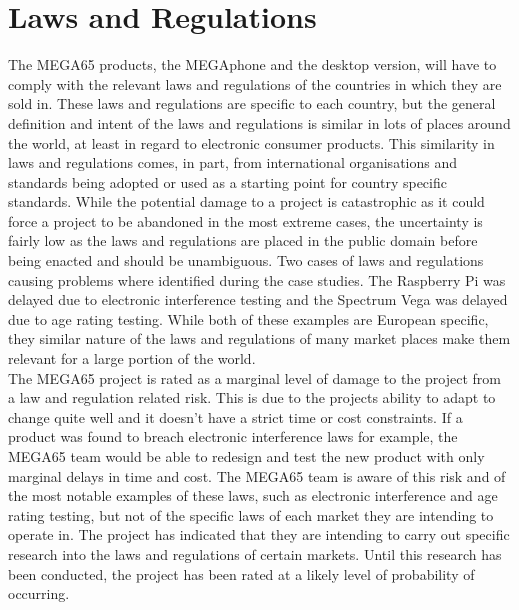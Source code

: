\section{Laws and Regulations}
The MEGA65 products, the MEGAphone and the desktop version, will have to comply with the relevant laws and regulations of the countries in which they are sold in. These laws and regulations are specific to each country, but the general definition and intent of the laws and regulations is similar in lots of places around the world, at least in regard to electronic consumer products. This similarity in laws and regulations comes, in part, from international organisations and standards being adopted or used as a starting point for country specific standards. While the potential damage to a project is catastrophic as it could force a project to be abandoned in the most extreme cases, the uncertainty is fairly low as the laws and regulations are placed in the public domain before being enacted and should be unambiguous. Two cases of laws and regulations causing problems where identified during the case studies. The Raspberry Pi was delayed due to electronic interference testing and the Spectrum Vega was delayed due to age rating testing. While both of these examples are European specific, they similar nature of the laws and regulations of many market places make them relevant for a large portion of the world. \\

The MEGA65 project is rated as a marginal level of damage to the project from a law and regulation related risk. This is due to the projects ability to adapt to change quite well and it doesn't have a strict time or cost constraints. If a product was found to breach electronic interference laws for example, the MEGA65 team would be able to redesign and test the new product with only marginal delays in time and cost. The MEGA65 team is aware of this risk and of the most notable examples of these laws, such as electronic interference and age rating testing, but not of the specific laws of each market they are intending to operate in. The project has indicated that they are intending to carry out specific research into the laws and regulations of certain markets. Until this research has been conducted, the project has been rated at a likely level of probability of occurring.  \\

